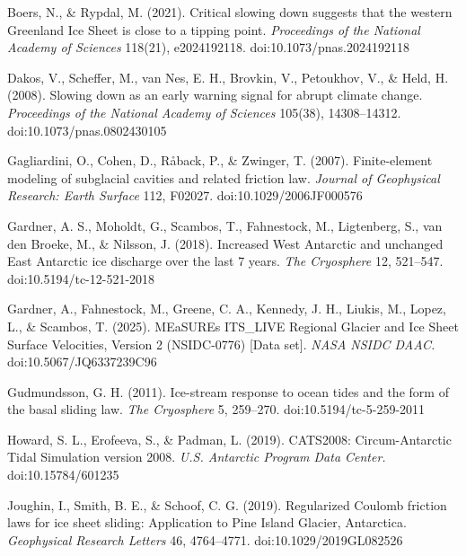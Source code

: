 \documentclass[tc, manuscript]{copernicus}
\begin{document}


\begin{thebibliography}{}
Boers, N., \& Rypdal, M. (2021). Critical slowing down suggests that the western Greenland Ice Sheet is close to a tipping point. \emph{Proceedings of the National Academy of Sciences} 118(21), e2024192118. doi:10.1073/pnas.2024192118

Dakos, V., Scheffer, M., van Nes, E. H., Brovkin, V., Petoukhov, V., \& Held, H. (2008). Slowing down as an early warning signal for abrupt climate change. \emph{Proceedings of the National Academy of Sciences} 105(38), 14308–14312. doi:10.1073/pnas.0802430105

Gagliardini, O., Cohen, D., Råback, P., \& Zwinger, T. (2007). Finite-element modeling of subglacial cavities and related friction law. \emph{Journal of Geophysical Research: Earth Surface} 112, F02027. doi:10.1029/2006JF000576

Gardner, A. S., Moholdt, G., Scambos, T., Fahnestock, M., Ligtenberg, S., van den Broeke, M., \& Nilsson, J. (2018). Increased West Antarctic and unchanged East Antarctic ice discharge over the last 7 years. \emph{The Cryosphere} 12, 521–547. doi:10.5194/tc-12-521-2018

Gardner, A., Fahnestock, M., Greene, C. A., Kennedy, J. H., Liukis, M., Lopez, L., \& Scambos, T. (2025). MEaSUREs ITS\_LIVE Regional Glacier and Ice Sheet Surface Velocities, Version 2 (NSIDC-0776) [Data set]. \emph{NASA NSIDC DAAC.} doi:10.5067/JQ6337239C96

Gudmundsson, G. H. (2011). Ice-stream response to ocean tides and the form of the basal sliding law. \emph{The Cryosphere} 5, 259–270. doi:10.5194/tc-5-259-2011

Howard, S. L., Erofeeva, S., \& Padman, L. (2019). CATS2008: Circum-Antarctic Tidal Simulation version 2008. \emph{U.S. Antarctic Program Data Center.} doi:10.15784/601235

Joughin, I., Smith, B. E., \& Schoof, C. G. (2019). Regularized Coulomb friction laws for ice sheet sliding: Application to Pine Island Glacier, Antarctica. \emph{Geophysical Research Letters} 46, 4764–4771. doi:10.1029/2019GL082526


\end{thebibliography}
\end{document}

